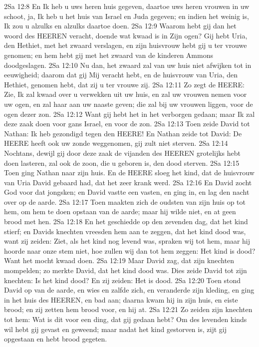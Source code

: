 2Sa 12:8  En Ik heb u uws heren huis gegeven, daartoe uws heren vrouwen in uw schoot, ja, Ik heb u het huis van Israel en Juda gegeven; en indien het weinig is, Ik zou u alzulks en alzulks daartoe doen.
2Sa 12:9  Waarom hebt gij dan het woord des HEEREN veracht, doende wat kwaad is in Zijn ogen? Gij hebt Uria, den Hethiet, met het zwaard verslagen, en zijn huisvrouw hebt gij u ter vrouwe genomen; en hem hebt gij met het zwaard van de kinderen Ammons doodgeslagen.
2Sa 12:10  Nu dan, het zwaard zal van uw huis niet afwijken tot in eeuwigheid; daarom dat gij Mij veracht hebt, en de huisvrouw van Uria, den Hethiet, genomen hebt, dat zij u ter vrouwe zij.
2Sa 12:11  Zo zegt de HEERE: Zie, Ik zal kwaad over u verwekken uit uw huis, en zal uw vrouwen nemen voor uw ogen, en zal haar aan uw naaste geven; die zal bij uw vrouwen liggen, voor de ogen dezer zon.
2Sa 12:12  Want gij hebt het in het verborgen gedaan; maar Ik zal deze zaak doen voor gans Israel, en voor de zon.
2Sa 12:13  Toen zeide David tot Nathan: Ik heb gezondigd tegen den HEERE! En Nathan zeide tot David: De HEERE heeft ook uw zonde weggenomen, gij zult niet sterven.
2Sa 12:14  Nochtans, dewijl gij door deze zaak de vijanden des HEEREN grotelijks hebt doen lasteren, zal ook de zoon, die u geboren is, den dood sterven.
2Sa 12:15  Toen ging Nathan naar zijn huis. En de HEERE sloeg het kind, dat de huisvrouw van Uria David gebaard had, dat het zeer krank werd.
2Sa 12:16  En David zocht God voor dat jongsken; en David vastte een vasten, en ging in, en lag den nacht over op de aarde.
2Sa 12:17  Toen maakten zich de oudsten van zijn huis op tot hem, om hem te doen opstaan van de aarde; maar hij wilde niet, en at geen brood met hen.
2Sa 12:18  En het geschiedde op den zevenden dag, dat het kind stierf; en Davids knechten vreesden hem aan te zeggen, dat het kind dood was, want zij zeiden: Ziet, als het kind nog levend was, spraken wij tot hem, maar hij hoorde naar onze stem niet, hoe zullen wij dan tot hem zeggen: Het kind is dood? Want het mocht kwaad doen.
2Sa 12:19  Maar David zag, dat zijn knechten mompelden; zo merkte David, dat het kind dood was. Dies zeide David tot zijn knechten: Is het kind dood? En zij zeiden: Het is dood.
2Sa 12:20  Toen stond David op van de aarde, en wies en zalfde zich, en veranderde zijn kleding, en ging in het huis des HEEREN, en bad aan; daarna kwam hij in zijn huis, en eiste brood; en zij zetten hem brood voor, en hij at.
2Sa 12:21  Zo zeiden zijn knechten tot hem: Wat is dit voor een ding, dat gij gedaan hebt? Om des levenden kinds wil hebt gij gevast en geweend; maar nadat het kind gestorven is, zijt gij opgestaan en hebt brood gegeten.
